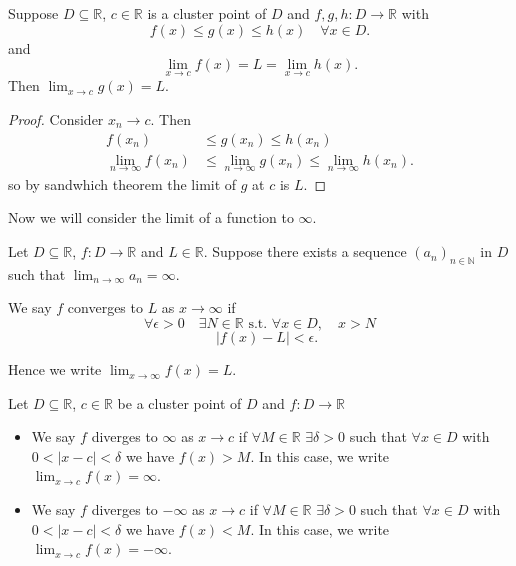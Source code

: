 \begin{theorem}
  Suppose $D \subseteq \mathbb{R}$, $c \in \mathbb{R}$ is a cluster point of $D$ and $f,g,h : D \rightarrow \mathbb{R}$ with
  \[f(x) \leq g(x) \leq h(x) \quad \forall x \in D.\]
  and
  \[\lim_{x \rightarrow c} f(x) = L = \lim_{x \rightarrow c} h(x).\]
  Then $\lim_{x \rightarrow c} g(x) = L$.
\end{theorem}
\begin{proof}
    Consider $x_n \rightarrow c$. Then
    \begin{align*}
      f(x_n) &\leq g(x_n) \leq h(x_n) \\
      \lim_{n \rightarrow \infty} f(x_n) &\leq \lim_{n \rightarrow \infty} g(x_n) \leq \lim_{n \rightarrow \infty} h(x_n)
    .\end{align*}
    so by sandwhich theorem the limit of $g$ at $c$ is $L$.
\end{proof}

Now we will consider the limit of a function to $\infty$.
\begin{definition}
    Let $D \subseteq \mathbb{R}$, $f : D \rightarrow \mathbb{R}$ and $L \in \mathbb{R}$. Suppose there exists a sequence $(a_n)_{n \in \mathbb{N}}$ in $D$ such that $\lim_{n \rightarrow \infty} a_n = \infty$.

    We say $f$ converges to $L$ as $x \rightarrow \infty$ if
    \[\forall \epsilon > 0 \quad \exists N \in \mathbb{R} \text{    s.t.  } \forall x \in D, \quad x > N \]
    \[\quad |f(x) - L | < \epsilon.\]

    Hence we write $\lim_{x \rightarrow \infty} f(x) = L$.
\end{definition}

\begin{definition}
    Let $D \subseteq \mathbb{R}$, $c \in \mathbb{R}$ be a cluster point of $D$ and $f: D \rightarrow \mathbb{R}$

    \begin{itemize}
      \item We say $f$ diverges to $\infty$ as $x \rightarrow c$ if $\forall M \in \mathbb{R}$ $\exists \delta >0$ such that $\forall x \in D$ with $0 < | x - c| < \delta$ we have $f(x) > M$. In this case, we write $\lim_{x \rightarrow c} f(x) = \infty$.
      \item We say $f$ diverges to $ - \infty$ as $x \rightarrow c$ if $\forall M \in \mathbb{R}$ $\exists \delta >0$ such that $\forall x \in D$ with $0 < | x - c| < \delta$ we have $f(x) < M$. In this case, we write $\lim_{x \rightarrow c} f(x) = - \infty$.
    \end{itemize}
\end{definition}
